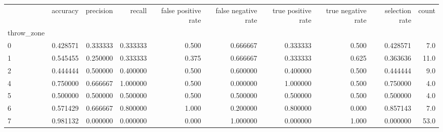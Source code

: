 \begin{tabular}{lrrrrrrrrr}
\toprule
{} &  accuracy &  precision &    recall &  false positive rate &  false negative rate &  true positive rate &  true negative rate &  selection rate &  count \\
throw\_zone &           &            &           &                      &                      &                     &                     &                 &        \\
\midrule
0          &  0.428571 &   0.333333 &  0.333333 &                0.500 &             0.666667 &            0.333333 &               0.500 &        0.428571 &    7.0 \\
1          &  0.545455 &   0.250000 &  0.333333 &                0.375 &             0.666667 &            0.333333 &               0.625 &        0.363636 &   11.0 \\
2          &  0.444444 &   0.500000 &  0.400000 &                0.500 &             0.600000 &            0.400000 &               0.500 &        0.444444 &    9.0 \\
4          &  0.750000 &   0.666667 &  1.000000 &                0.500 &             0.000000 &            1.000000 &               0.500 &        0.750000 &    4.0 \\
5          &  0.500000 &   0.500000 &  0.500000 &                0.500 &             0.500000 &            0.500000 &               0.500 &        0.500000 &    4.0 \\
6          &  0.571429 &   0.666667 &  0.800000 &                1.000 &             0.200000 &            0.800000 &               0.000 &        0.857143 &    7.0 \\
7          &  0.981132 &   0.000000 &  0.000000 &                0.000 &             1.000000 &            0.000000 &               1.000 &        0.000000 &   53.0 \\
\bottomrule
\end{tabular}
